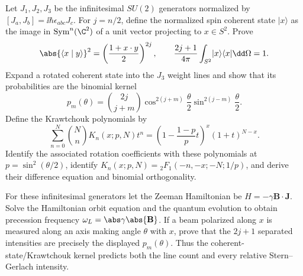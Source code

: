 \begin{exercise}
Let $J_1,J_2,J_3$ be the infinitesimal $SU(2)$ generators normalized by
$[J_a,J_b]=\ii\hbar\epsilon_{abc}J_c$.  For $j=n/2$, define the normalized
spin coherent state $\lvert x\rangle$ as
the image in $\operatorname{Sym}^n(\C^2)$ of a unit vector projecting to
$x\in S^2$.  Prove
\[
 \abs{\langle x\mid y\rangle}^2=\left(\frac{1+x\cdot y}{2}\right)^{2j},
 \qquad
 \frac{2j+1}{4\pi}\int_{S^2}\lvert x\rangle\langle x\rvert\dd\Omega=1.
\]
Expand a rotated coherent state into the $J_3$ weight lines and show that its
probabilities are the binomial kernel
\[
 p_m(\theta)=\binom{2j}{j+m}
 \cos^{2(j+m)}\frac\theta2\sin^{2(j-m)}\frac\theta2.
\]
Define the Krawtchouk polynomials by
\[
 \sum_{n=0}^N\binom NnK_n(x;p,N)t^n
 =\left(1-\frac{1-p}{p}t\right)^x(1+t)^{N-x}.
\]
Identify the associated rotation coefficients with these polynomials at
$p=\sin^2(\theta/2)$, identify
$K_n(x;p,N)={}_2F_1(-n,-x;-N;1/p)$, and derive their difference equation and
binomial orthogonality.
\end{exercise}

\begin{exercise}
For these infinitesimal generators let the Zeeman Hamiltonian be
$H=-\gamma\mathbf B\cdot\mathbf J$.  Solve the Hamiltonian orbit equation and
the quantum evolution to obtain precession frequency
$\omega_L=\abs\gamma\abs{\mathbf B}$.  If a beam polarized along $x$ is
measured along an axis making angle $\theta$ with $x$, prove that the
$2j+1$ separated intensities are precisely the displayed $p_m(\theta)$.  Thus the
coherent-state/Krawtchouk kernel predicts both the line count and every
relative Stern--Gerlach intensity.
\end{exercise}

